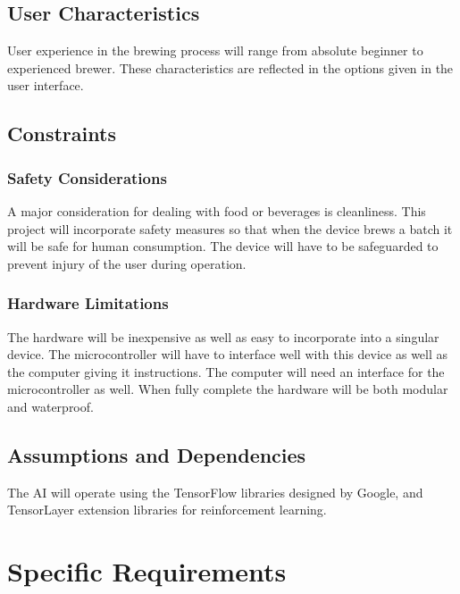 \documentclass[draftclsnofoot,onecolumn,letterpaper,10pt]{IEEEtran}
\begin{document}
\subsection{User Characteristics}
User experience in the brewing process will range from absolute beginner to experienced brewer.
These characteristics are reflected in the options given in the user interface.

\subsection{Constraints}
\subsubsection{Safety Considerations}
A major consideration for dealing with food or beverages is cleanliness.
This project will incorporate safety measures so that when the device brews a batch it will be safe for human consumption.
The device will have to be safeguarded to prevent injury of the user during operation.
\subsubsection{Hardware Limitations}
The hardware will be inexpensive as well as easy to incorporate into a singular device.
The microcontroller will have to interface well with this device as well as the computer giving it instructions.
The computer will need an interface for the microcontroller as well.
When fully complete the hardware will be both modular and waterproof.

\subsection{Assumptions and Dependencies}
The AI will operate using the TensorFlow libraries designed by Google, and TensorLayer extension libraries for reinforcement learning.

\section{Specific Requirements}
\end{document}
